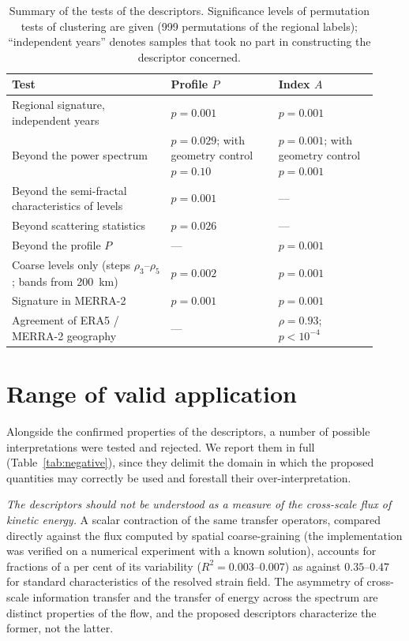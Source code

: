 \documentclass[11pt,a4paper]{article}
\begin{document}
\begin{table}[t]
\centering
\caption{Summary of the tests of the descriptors. Significance levels of permutation tests of clustering are given (999 permutations of the regional labels); ``independent years'' denotes samples that took no part in constructing the descriptor concerned.}
\label{tab:tests}
\small
\begin{tabular}{@{}p{0.40\linewidth}p{0.27\linewidth}p{0.25\linewidth}@{}}
\toprule
Test & Profile $P$ & Index $A$\\
\midrule
Regional signature, independent years & $p=0.001$ & $p=0.001$\\
Beyond the power spectrum & $p=0.029$; with geometry control $p=0.10$ & $p=0.001$; with geometry control $p=0.001$\\
Beyond the semi-fractal characteristics of levels \cite{Krenke2019} & $p=0.001$ & ---\\
Beyond scattering statistics \cite{Cheng2024} & $p=0.026$ & ---\\
Beyond the profile $P$ & --- & $p=0.001$\\
Coarse levels only (steps $\rho_3$--$\rho_5$; bands from 200~km) & $p=0.002$ & $p=0.001$\\
Signature in MERRA-2 & $p=0.001$ & $p=0.001$\\
Agreement of ERA5 / MERRA-2 geography & --- & $\rho=0.93$; $p<10^{-4}$\\
\bottomrule
\end{tabular}
\end{table}

\section{Range of valid application}
\label{sec:limits}

Alongside the confirmed properties of the descriptors, a number of possible interpretations were tested and rejected. We report them in full (Table~\ref{tab:negative}), since they delimit the domain in which the proposed quantities may correctly be used and forestall their over-interpretation.

\emph{The descriptors should not be understood as a measure of the cross-scale flux of kinetic energy.} A scalar contraction of the same transfer operators, compared directly against the flux computed by spatial coarse-graining \cite{Germano1992,Aluie2018} (the implementation was verified on a numerical experiment with a known solution), accounts for fractions of a per cent of its variability ($R^2=0.003$--$0.007$) as against $0.35$--$0.47$ for standard characteristics of the resolved strain field. The asymmetry of cross-scale information transfer and the transfer of energy across the spectrum are distinct properties of the flow, and the proposed descriptors characterize the former, not the latter.
\end{document}
